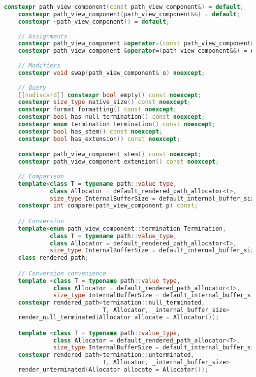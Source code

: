 \documentclass[11pt]{article}
\begin{document}
\begin{lstlisting}[language=cpp]
    constexpr path_view_component(const path_view_component&) = default;
    constexpr path_view_component(path_view_component&&) = default;
    constexpr ~path_view_component() = default;
    
    // Assignments
    constexpr path_view_component &operator=(const path_view_component&) = default;
    constexpr path_view_component &operator=(path_view_component&&) = default;
    
    // Modifiers
    constexpr void swap(path_view_component& o) noexcept;
    
    // Query
    [[nodiscard]] constexpr bool empty() const noexcept;
    constexpr size_type native_size() const noexcept;
    constexpr format formatting() const noexcept;
    constexpr bool has_null_termination() const noexcept;
    constexpr enum termination termination() const noexcept;
    constexpr bool has_stem() const noexcept;
    constexpr bool has_extension() const noexcept;

    constexpr path_view_component stem() const noexcept;
    constexpr path_view_component extension() const noexcept;
    
    // Comparison
    template<class T = typename path::value_type,
             class Allocator = default_rendered_path_allocator<T>,
             size_type InternalBufferSize = default_internal_buffer_size>
    constexpr int compare(path_view_component p) const;

    // Conversion
    template<enum path_view_component::termination Termination,
             class T = typename path::value_type,
             class Allocator = default_rendered_path_allocator<T>,
             size_type InternalBufferSize = default_internal_buffer_size>
    class rendered_path;

    // Conversion convenience
    template <class T = typename path::value_type,
              class Allocator = default_rendered_path_allocator<T>,
              size_type InternalBufferSize = default_internal_buffer_size>
    constexpr rendered_path<termination::null_terminated,
                            T, Allocator, _internal_buffer_size>
    render_null_terminated(Allocator allocate = Allocator());

    template <class T = typename path::value_type,
              class Allocator = default_rendered_path_allocator<T>,
              size_type InternalBufferSize = default_internal_buffer_size>
    constexpr rendered_path<termination::unterminated,
                            T, Allocator, _internal_buffer_size>
    render_unterminated(Allocator allocate = Allocator());



\end{lstlisting}
\end{document}
